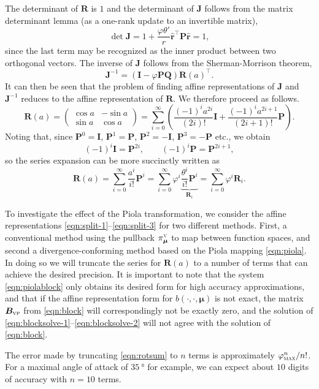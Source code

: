 \documentclass[onecolumn, twoside, a4paper, 11pt]{article}
\begin{document}
The determinant of $\bm R$ is $1$ and the determinant of $\bm J$ follows
from the matrix determinant lemma (as a one-rank update to an invertible
matrix),
\[
  \det \bm J = 1 + \frac{\varphi\theta'}{r} \hat{\bm r}^\intercal \bm P \hat{\bm r} = 1,
\]
since the last term may be recognized as the inner product between two
orthogonal vectors. The inverse of $\bm J$ follows from the Sherman-Morrison theorem,
\[
  \bm J^{-1} = \left( \bm I - \varphi \bm P \bm Q \right)
  \bm R(a)^\intercal.
\]
It can then be seen that the problem of finding affine representations of
$\bm J$ and $\bm J^{-1}$ reduces to the affine representation of $\bm R$.
We therefore proceed as follows.
\[
  \bm R(a)
  = \begin{pmatrix} \cos a & -\sin a \\ \sin a & \cos a \end{pmatrix}
  = \sum_{i=0}^\infty \left( \frac{(-1)^i a^{2i}}{(2i)!} \bm I
    + \frac{(-1)^i a^{2i+1}}{(2i+1)!} \bm P \right).
\]
Noting that, since $\bm P^0 = \bm I$, $\bm P^1 = \bm P$, $\bm P^2 = -\bm I$,
$\bm P^3 = -\bm P$ etc., we obtain
\[
  (-1)^i \bm I = \bm P^{2i}, \qquad (-1)^i \bm P = \bm P^{2i+1},
\]
so the series expansion can be more succinctly written as
\begin{equation}
  \label{eqn:rotsum}
  \bm R(a) = \sum_{i=0}^\infty \frac{a^i}{i!} \bm P^i
  = \sum_{i=0}^\infty \varphi^i \underbrace{\frac{\theta^i}{i!}\bm P^i}_{\bm R_i}
  = \sum_{i=0}^\infty \varphi^i \bm R_i.
\end{equation}

To investigate the effect of the Piola transformation, we consider the affine representations
\eqref{eqn:split-1}--\eqref{eqn:split-3} for two different methods. First, a conventional method
using the pullback $\pi_{\bm \mu}^\textsc{v}$ to map between function spaces, and second a
divergence-conforming method based on the Piola mapping \eqref{eqn:piola}.  In doing so we will
truncate the series for $\bm R(a)$ to a number of terms that can achieve the desired precision. It
is important to note that the system \eqref{eqn:piolablock} only obtains its desired form for high
accuracy approximations, and that if the affine representation form for $b(\cdot,\cdot,\bm \mu)$ is
not exact, the matrix $\bm B_\textsc{vp}$ from \eqref{eqn:block} will correspondingly not be exactly
zero, and the solution of \eqref{eqn:blocksolve-1}--\eqref{eqn:blocksolve-2} will not agree with the
solution of \eqref{eqn:block}.

The error made by truncating \eqref{eqn:rotsum} to $n$ terms is approximately
$\varphi_\textsc{max}^n / n!$. For a maximal angle of attack of
$\SI{35}{\degree}$ for example, we can expect about $10$ digits of accuracy
with $n=10$ terms.
\end{document}
